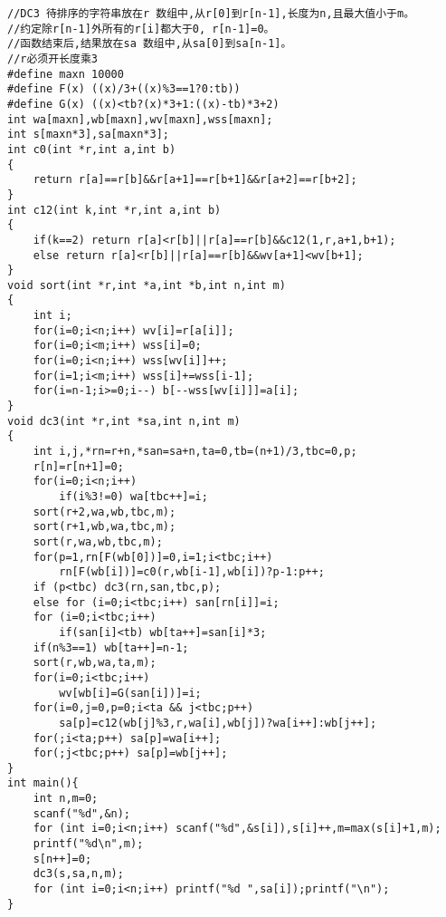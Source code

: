 \begin{lstlisting}
//DC3 待排序的字符串放在r 数组中,从r[0]到r[n-1],长度为n,且最大值小于m。
//约定除r[n-1]外所有的r[i]都大于0, r[n-1]=0。
//函数结束后,结果放在sa 数组中,从sa[0]到sa[n-1]。
//r必须开长度乘3
#define maxn 10000
#define F(x) ((x)/3+((x)%3==1?0:tb))
#define G(x) ((x)<tb?(x)*3+1:((x)-tb)*3+2)
int wa[maxn],wb[maxn],wv[maxn],wss[maxn];
int s[maxn*3],sa[maxn*3];
int c0(int *r,int a,int b)
{
	return r[a]==r[b]&&r[a+1]==r[b+1]&&r[a+2]==r[b+2];
}
int c12(int k,int *r,int a,int b)
{
	if(k==2) return r[a]<r[b]||r[a]==r[b]&&c12(1,r,a+1,b+1);
	else return r[a]<r[b]||r[a]==r[b]&&wv[a+1]<wv[b+1];
}
void sort(int *r,int *a,int *b,int n,int m)
{
	int i;
	for(i=0;i<n;i++) wv[i]=r[a[i]];
	for(i=0;i<m;i++) wss[i]=0;
	for(i=0;i<n;i++) wss[wv[i]]++;
	for(i=1;i<m;i++) wss[i]+=wss[i-1];
	for(i=n-1;i>=0;i--) b[--wss[wv[i]]]=a[i];
}
void dc3(int *r,int *sa,int n,int m)
{
	int i,j,*rn=r+n,*san=sa+n,ta=0,tb=(n+1)/3,tbc=0,p;
	r[n]=r[n+1]=0;
	for(i=0;i<n;i++)
		if(i%3!=0) wa[tbc++]=i;
	sort(r+2,wa,wb,tbc,m);
	sort(r+1,wb,wa,tbc,m);
	sort(r,wa,wb,tbc,m);
	for(p=1,rn[F(wb[0])]=0,i=1;i<tbc;i++)
		rn[F(wb[i])]=c0(r,wb[i-1],wb[i])?p-1:p++;
	if (p<tbc) dc3(rn,san,tbc,p);
	else for (i=0;i<tbc;i++) san[rn[i]]=i;
	for (i=0;i<tbc;i++)
		if(san[i]<tb) wb[ta++]=san[i]*3;
	if(n%3==1) wb[ta++]=n-1;
	sort(r,wb,wa,ta,m);
	for(i=0;i<tbc;i++)
		wv[wb[i]=G(san[i])]=i;
	for(i=0,j=0,p=0;i<ta && j<tbc;p++)
		sa[p]=c12(wb[j]%3,r,wa[i],wb[j])?wa[i++]:wb[j++];
	for(;i<ta;p++) sa[p]=wa[i++];
	for(;j<tbc;p++) sa[p]=wb[j++];
}
int main(){
	int n,m=0;
	scanf("%d",&n);
	for (int i=0;i<n;i++) scanf("%d",&s[i]),s[i]++,m=max(s[i]+1,m);
	printf("%d\n",m);
	s[n++]=0;
	dc3(s,sa,n,m);
	for (int i=0;i<n;i++) printf("%d ",sa[i]);printf("\n");
}
\end{lstlisting}
